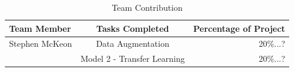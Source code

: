 \documentclass[paper=a4, fontsize=11pt]{scrartcl}
\numberwithin{equation}{section}		%
\numberwithin{table}{section}				%
\begin{document}
\begin{table}[h!]
  \begin{center}
    \caption{Team Contribution}
    \label{tab:contributionTable}
    \begin{tabular}{l|c|r}
      \textbf{Team Member} & \textbf{Tasks Completed} & \textbf{Percentage of Project}\\
      \hline
      Stephen McKeon & Data Augmentation & 20\%...?\\
                     & Model 2 - Transfer Learning & 20\%...?\\
    \end{tabular}
  \end{center}
\end{table}

\clearpage
 




\end{document}
